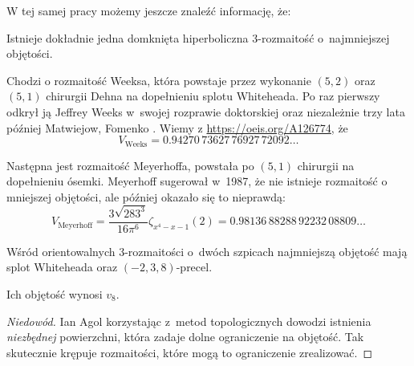 W tej samej pracy możemy jeszcze znaleźć informację, że:

\begin{proposition}
    Istnieje dokładnie jedna domknięta hiperboliczna 3-rozmaitość o~najmniejszej objętości.
\end{proposition}

Chodzi o rozmaitość Weeksa, która powstaje przez wykonanie $(5, 2)$ oraz $(5, 1)$ chirurgii Dehna na dopełnieniu splotu Whiteheada.
%
%
%
Po raz pierwszy odkrył ją Jeffrey Weeks \cite{weeks85} w~swojej rozprawie doktorskiej oraz niezależnie trzy lata później Matwiejow, Fomenko \cite{fomenko88}.
%
%
%
Wiemy z \url{https://oeis.org/A126774}, że
\begin{equation}
    V_{\textrm{Weeks}} = 0.94270 \, 73627 \, 76927 \, 72092 \ldots
\end{equation}

Następna jest rozmaitość Meyerhoffa, powstała po $(5, 1)$ chirurgii na dopełnieniu ósemki.
%
Meyerhoff sugerował w~1987, że nie istnieje rozmaitość o mniejszej objętości, ale później okazało się to nieprawdą: 
\begin{equation}
    V_{\textrm{Meyerhoff}} = \frac{ 3 \sqrt{283^3} } {16 \pi^6} \zeta_{x^4-x-1}(2) = 0.98136 \, 88288 \, 92232 \, 08809 \ldots
\end{equation}

\begin{proposition}
    Wśród orientowalnych 3-rozmaitości o~dwóch szpicach najmniejszą objętość mają splot Whiteheada oraz $(-2, 3, 8)$-precel.
%
%
%
\end{proposition}


Ich objętość wynosi $v_8$.

\begin{proof}[Niedowód]
%
    Ian Agol \cite{agol10} korzystając z~metod topologicznych dowodzi istnienia \emph{niezbędnej} powierzchni, która zadaje dolne ograniczenie na objętość.
    Tak skutecznie krępuje rozmaitości, które mogą to ograniczenie zrealizować.
\end{proof}

